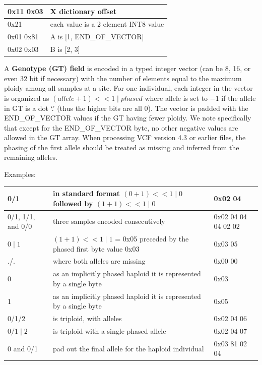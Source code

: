 \documentclass[8pt]{article}
\begin{document}
\vspace{0.3cm}
\begin{tabular}{|p{2cm} | l |} \hline
0x11 0x03 & X dictionary offset \\ \hline
0x21 & each value is a 2 element INT8 value \\ \hline
0x01 0x81 & A is [1, END\_OF\_VECTOR] \\ \hline
0x02 0x03 & B is [2, 3] \\ \hline
\end{tabular}
\vspace{0.3cm}


\vspace{0.3cm}
A \textbf{Genotype (GT) field} is encoded in a typed integer vector (can be 8, 16, or even 32 bit if necessary) with the number of elements equal to the maximum ploidy among all samples at a site.
For one individual, each integer in the vector is organized as $(allele+1) << 1 \mid phased$ where allele is set to $-1$ if the allele in GT is a dot `.' (thus the higher bits are all 0).
The vector is padded with the END\_OF\_VECTOR values if the GT having fewer ploidy.
We note specifically that except for the END\_OF\_VECTOR byte, no other negative values are allowed in the GT array.
When processing VCF version 4.3 or earlier files, the phasing of the first allele should be treated as missing and inferred from the remaining alleles.

Examples:

\vspace{0.3cm}
\small
\begin{tabular}{|p{2.5cm} | p{10cm} | p{3cm}|} \hline
0/1 & in standard format $(0 + 1) << 1 \mid 0$ followed by $(1 + 1) << 1 \mid 0$ & 0x02 04 \\ \hline
0/1, 1/1, and 0/0 & three samples encoded consecutively & 0x02 04 04 04 02 02 \\ \hline
$0\mid1$ & $(1 + 1) << 1 \mid 1$ = 0x05 preceded by the phased first byte value 0x03 & 0x03 05 \\ \hline
./. & where both alleles are missing & 0x00 00 \\ \hline
0 & as an implicitly phased haploid it is represented by a single byte & 0x03 \\ \hline
1 & as an implicitly phased haploid it is represented by a single byte & 0x05 \\ \hline
0/1/2 & is triploid, with alleles & 0x02 04 06 \\ \hline
$0/1\mid2$ & is triploid with a single phased allele & 0x02 04 07 \\ \hline
0 and 0/1 & pad out the final allele for the haploid individual & 0x03 81 02 04\\ \hline
\end{tabular}
\normalsize
\end{document}
